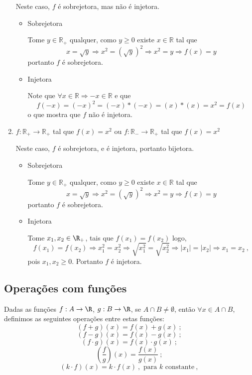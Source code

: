 \begin{exem}
\begin{enumerate}
  Neste caso, $f$ é sobrejetora, mas não é injetora.

  \begin{dem}
   \begin{itemize}
    \item Sobrejetora

    Tome $y \in \mathbb{R_{+}}$ qualquer, como $y \geq 0$ existe $x \in \mathbb{R}$ tal que
    \[x = \sqrt{y} \Rightarrow x^2 = (\sqrt{y})^2 \Rightarrow x^2 = y \Rightarrow f(x) = y \]
    portanto $f$ é sobrejetora.
    \fim
    \item Injetora

    Note que $ \forall x \in \mathbb{R} \Rightarrow -x \in \mathbb{R}$ e que
    \[f(-x)= (-x)^2 = (-x)*(-x) = (x)*(x) = x^2 = f(x)\]
    o que mostra que $f$ não é injetora.

   \end{itemize}
  \end{dem}

  \item $f: \mathbb{R_{+}} \rightarrow \mathbb{R_{+}}$ tal que $f(x) = x^2$ ou $f: \mathbb{R_{-}} \rightarrow \mathbb{R_{+}}$ tal que $f(x) = x^2$

  Neste caso, $f$ é sobrejetora, e é injetora, portanto bijetora.

  \begin{dem}
   \begin{itemize}
    \item Sobrejetora

    Tome $y \in \mathbb{R_{+}}$ qualquer, como $y \geq 0$ existe $x \in \mathbb{R}$ tal que
    \[x = \sqrt{y} \Rightarrow x^2 = (\sqrt{y})^2 \Rightarrow x^2 = y \Rightarrow f(x) = y\]
    portanto $f$ é sobrejetora.
    \fim
    \item Injetora

    Tome $x_1, x_2 \in \R_{+}$, tais que $f(x_1) = f(x_2)$ logo,
    \[f(x_1) = f(x_2) \Rightarrow x_1^2= x_2^2 \Rightarrow \sqrt{x_1^2}= \sqrt{x_2^2} \Rightarrow |x_1|= |x_2| \Rightarrow x_1= x_2 \ , \]
    pois $x_1, x_2 \geqslant 0$. Portanto $f$ é injetora.

   \end{itemize}
  \end{dem}

 \end{enumerate}

\end{exem}

\subsection{Operações com funções}
Dadas as funções $f: A \rightarrow \R$, $g: B \rightarrow \R$, se $A \cap B \neq \emptyset$, então $\forall x \in A \cap B$, definimos as seguintes operações entre estas funções:
\[(f + g)(x)= f(x) + g(x) \ ; \]
\[(f - g)(x)= f(x) - g(x) \ ; \]
\[(f \cdot g)(x)= f(x) \cdot g(x) \ ; \]
\[ \left( \frac{f}{g} \right) (x)= \frac{f(x)}{g(x)} \ ;\]
\[(k \cdot f)(x)= k \cdot f(x) \ , \text{ para } k \text{ constante} \ ,\]


